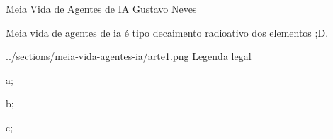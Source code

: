 \hypearticle
{Meia Vida de Agentes de IA}
{Gustavo Neves}
{

Meia vida de agentes de ia é tipo decaimento radioativo dos elementos ;D.



{../sections/meia-vida-agentes-ia/arte1.png}
{Legenda legal}

\begin{hypeitemize}
\item a;
\item b;
\item c;
\end{hypeitemize}


}